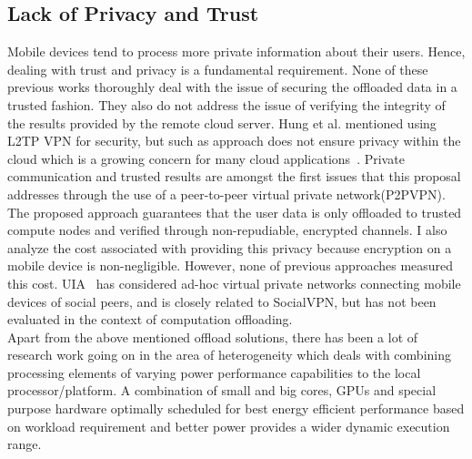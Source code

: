 \subsection{Lack of Privacy and Trust}
\label{intro:lack}
%
Mobile devices tend to process more private information about their
users.
%
Hence, dealing with trust and privacy is a fundamental requirement.
%
None of these previous works thoroughly deal with the issue of securing
the offloaded data in a trusted fashion.
%
They also do not address the issue of verifying the integrity of the
results provided by the remote cloud server.
%
Hung et al. mentioned using L2TP VPN for security, but such as approach
does not ensure privacy within the cloud which is a growing concern for
many cloud applications~\cite{brodkin}.
%
Private communication and trusted results are amongst the first issues
that this proposal addresses through the use of a peer-to-peer virtual
private network(P2PVPN). 
%
The proposed approach guarantees that the user data is only offloaded to
trusted compute nodes and verified through non-repudiable, encrypted
channels.
%
I also analyze the cost associated with providing this privacy because
encryption on a mobile device is non-negligible.
%
However, none of previous approaches measured this cost.
%
UIA~\cite{uia} has considered ad-hoc virtual private networks connecting
mobile devices of social peers, and is closely related to SocialVPN, but
has not been evaluated in the context of computation offloading.\\
%
Apart from the above mentioned offload solutions, there has been a lot
of research work going on in the area of heterogeneity which deals with
combining processing elements of varying power performance capabilities
to the local processor/platform.
%
A combination of small and big cores, GPUs and special purpose hardware
optimally scheduled for best energy efficient performance based on
workload requirement and better power provides a wider dynamic execution
range.
%
